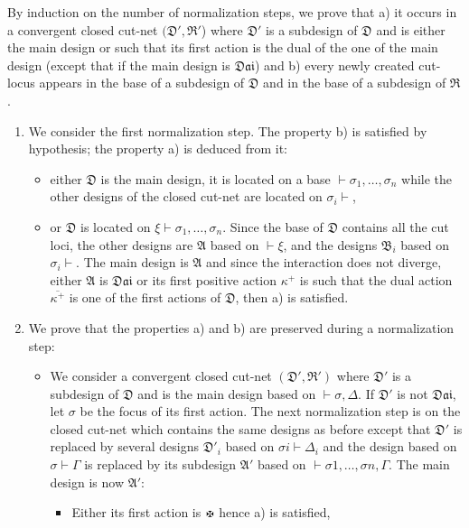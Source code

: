 \documentclass{LMCS}
\newcommand{\design}[1]{{\mathfrak{#1}}}
\newcommand{\dai}{\design{Dai}}
\begin{document}
\proof By induction on the number of normalization steps, we prove that a) it occurs in a convergent closed cut-net  $(\design{D}',\design{R}'$) where $\design{D}'$ is a subdesign of $\design{D}$ and is either the main design or such that its first action is the dual of the one of the main design (except that if the main design is $\dai$) and b)  every newly  created  cut-locus appears in the base of a subdesign of $\design{D}$ and in the base of a subdesign of $\design{R}$.
\begin{enumerate}
\item We consider the first normalization step. The property  b) is satisfied by hypothesis; the property a) is deduced from it:
\begin{itemize}
\item either ${\design{D}}$ is the main design, it is located on a base $\vdash\sigma_1,\dots,\sigma_n$ while the other designs of the closed cut-net are located on $\sigma_i\vdash$,
\item or $\design{D}$ is located on $\xi\vdash\sigma_1,\dots,\sigma_n$. Since the base of $\design{D}$ contains all the cut loci, the other designs are  $\design{A}$ based on  $\vdash \xi$, and the designs $\design{B}_i$ based on $\sigma_i \vdash$. The main design is $\design{A}$ and since the interaction does not diverge, either $\design{A}$ is  $\dai$ or its first positive action $\kappa^+$ is such that the dual action $\overline{\kappa^+}$ is one of the first actions of $\design{D}$, then a) is satisfied.
\end{itemize}
\item We prove that the properties a) and b) are preserved during a normalization step:
\begin{itemize}
\item We consider a convergent closed cut-net $(\design{D}',\design{R}')$ where $\design{D}'$ is a subdesign of $\design{D}$ and is the main design based on $\vdash \sigma, \Delta$. If $\design{D}'$ is not $\dai$, let $\sigma$ be the focus of its first action. The next normalization step is on the closed cut-net which contains the same designs as before except that $\design{D}'$ is replaced by several designs $\design{D}'_i$ based on $\sigma i\vdash\Delta_i$ and the design based on $\sigma\vdash\Gamma$ is replaced by its subdesign $\design{A}'$ based on $\vdash \sigma 1,\dots,\sigma n,\Gamma$. The main design is now $\design{A}'$:
\begin{itemize}
\item Either its first action is $\daimon$  hence a) is satisfied, 

\end{itemize}
\end{itemize}
\end{enumerate}
\end{document}
